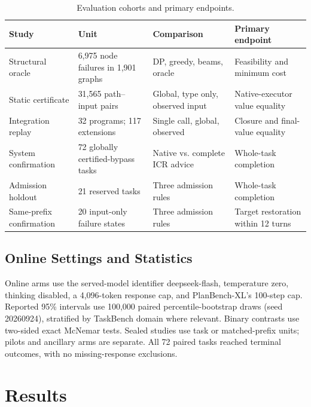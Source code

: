\begin{table}[t]
\centering\footnotesize\setlength{\tabcolsep}{5pt}
\caption{Evaluation cohorts and primary endpoints.}
\label{tab:study-map}
\begin{tabular}{llll}
\toprule
\textbf{Study} & \textbf{Unit} & \textbf{Comparison} & \textbf{Primary endpoint}\\
\midrule
Structural oracle & 6,975 node failures in 1,901 graphs & DP, greedy, beams, oracle & Feasibility and minimum cost\\
Static certificate & 31,565 path--input pairs & Global, type only, observed input & Native-executor value equality\\
Integration replay & 32 programs; 117 extensions & Single call, global, observed & Closure and final-value equality\\
System confirmation & 72 globally certified-bypass tasks & Native vs. complete ICR advice & Whole-task completion\\
Admission holdout & 21 reserved tasks & Three admission rules & Whole-task completion\\
Same-prefix confirmation & 20 input-only failure states & Three admission rules & Target restoration within 12 turns\\
\bottomrule
\end{tabular}
\end{table}

\subsection{Online Settings and Statistics}
Online arms use the served-model identifier deepseek-flash, temperature zero,
thinking disabled, a 4,096-token response cap, and PlanBench-XL's 100-step cap.
Reported 95\% intervals use 100,000 paired percentile-bootstrap draws (seed
20260924), stratified by TaskBench domain where relevant. Binary contrasts use
two-sided exact McNemar tests. Sealed studies use task or matched-prefix units;
pilots and ancillary arms are separate. All 72 paired tasks reached terminal
outcomes, with no missing-response exclusions.

\section{Results}

